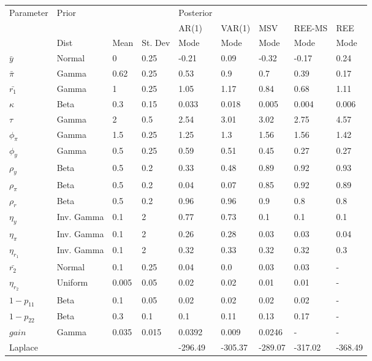 \documentclass[12pt,reqno]{article}
\numberwithin{equation}{section}
\begin{document}
\begin{table}[H]
\begin{tabular}{l||lll||l|l|l|ll}
Parameter & Prior &  &  & Posterior &  &  &  &  \\
 &  &  &  & AR(1) & VAR(1) & MSV & REE-MS & REE \\
\hline
\hline
 & Dist & Mean & St. Dev & Mode & Mode & Mode & Mode & Mode  \\
$\bar{y}$ & Normal & 0 & 0.25 & -0.21 & 0.09 & -0.32 & -0.17 & 0.24 \\
$\bar{\pi}$ & Gamma & 0.62 & 0.25 & 0.53 & 0.9 & 0.7 & 0.39 & 0.17 \\
$\bar{r_1}$ & Gamma & 1 & 0.25 & 1.05 & 1.17 & 0.84 & 0.68 & 1.11 \\
$\kappa$ & Beta & 0.3 & 0.15 & 0.033 & 0.018 & 0.005 & 0.004 & 0.006 \\
$\tau$ & Gamma & 2 & 0.5 & 2.54 & 3.01 & 3.02 & 2.75 & 4.57 \\
$\phi_{\pi}$ & Gamma & 1.5 & 0.25 & 1.25 & 1.3 & 1.56 & 1.56 & 1.42 \\
$\phi_y$ & Gamma & 0.5 & 0.25 & 0.59 & 0.51 & 0.45 & 0.27 & 0.27 \\
$\rho_y$ & Beta & 0.5 & 0.2 & 0.33 & 0.48 & 0.89 & 0.92 & 0.93 \\
$\rho_{\pi}$ & Beta & 0.5 & 0.2 & 0.04 & 0.07 & 0.85 & 0.92 & 0.89 \\
$\rho_r$ & Beta & 0.5 & 0.2 & 0.96 & 0.96 & 0.9 & 0.8 & 0.8 \\
$\eta_y$ & Inv. Gamma & 0.1 & 2 & 0.77 & 0.73 & 0.1 & 0.1 & 0.1 \\
$\eta_{\pi}$ & Inv. Gamma & 0.1 & 2 & 0.26 & 0.28 & 0.03 & 0.03 & 0.04 \\
$\eta_{r_1}$ & Inv. Gamma & 0.1 & 2 & 0.32 & 0.33 & 0.32 & 0.32 & 0.3 \\
$\bar{r_2}$ & Normal & 0.1 & 0.25 & 0.04 & 0.0 & 0.03 & 0.03 & - \\
$\eta_{r_2}$ & Uniform & 0.005 & 0.05 & 0.02 & 0.02 & 0.01 & 0.01 & - \\
$1-p_{11}$ & Beta & 0.1 & 0.05 & 0.02 & 0.02 & 0.02 & 0.02 & - \\
$1-p_{22}$ & Beta & 0.3 & 0.1 & 0.1 & 0.11 & 0.13 & 0.17 & - \\
$gain$ & Gamma & 0.035 & 0.015 & 0.0392 & 0.009 & 0.0246 & - & - \\
 \hline
\hline
Laplace &  &  &  & -296.49 & -305.37 & -289.07  & -317.02 & -368.49
\end{tabular}
\end{table}
\end{document}
